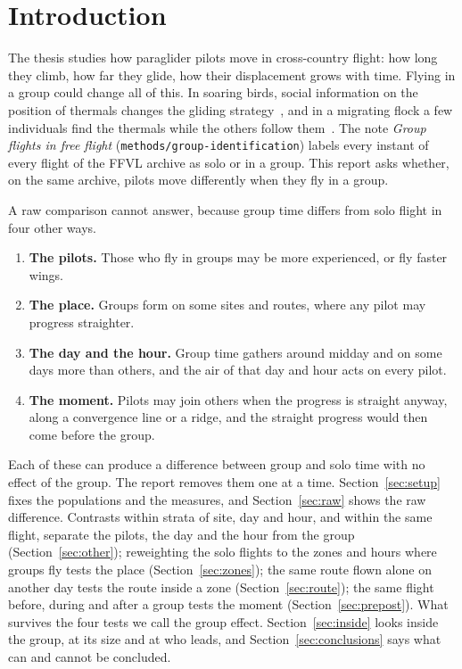 \section{Introduction}\label{sec:intro}

The thesis studies how paraglider pilots move in cross-country flight: how long they climb, how far
they glide, how their displacement grows with time. Flying in a group could change all of this.
In soaring birds, social information on the position of thermals changes the gliding
strategy~\cite{williams2018}, and in a migrating flock a few individuals find the thermals while the
others follow them~\cite{flack2018}. The note
\emph{Group flights in free flight} (\texttt{methods/group-identification}) labels every instant of
every flight of the FFVL archive as solo or in a group. This report asks whether, on the same
archive, pilots move differently when they fly in a group.

A raw comparison cannot answer, because group time differs from solo flight in four other ways.
\begin{enumerate}[label=(\roman*)]
  \item \textbf{The pilots.} Those who fly in groups may be more experienced, or fly faster wings.
  \item \textbf{The place.} Groups form on some sites and routes, where any pilot may progress
        straighter.
  \item \textbf{The day and the hour.} Group time gathers around midday and on some days more than
        others, and the air of that day and hour acts on every pilot.
  \item \textbf{The moment.} Pilots may join others when the progress is straight anyway, along a
        convergence line or a ridge, and the straight progress would then come before the group.
\end{enumerate}
Each of these can produce a difference between group and solo time with no effect of the group. The
report removes them one at a time. Section~\ref{sec:setup} fixes the populations and the measures,
and Section~\ref{sec:raw} shows the raw difference. Contrasts within strata of site, day and hour,
and within the same flight, separate the pilots, the day and the hour from the group
(Section~\ref{sec:other}); reweighting the solo flights to the zones and hours where groups fly
tests the place (Section~\ref{sec:zones}); the same route flown alone on another day tests the route
inside a zone (Section~\ref{sec:route}); the same flight before, during and after a group tests the
moment (Section~\ref{sec:prepost}). What survives the four tests we call the group effect.
Section~\ref{sec:inside} looks inside the group, at its size and at who leads, and
Section~\ref{sec:conclusions} says what can and cannot be concluded.
